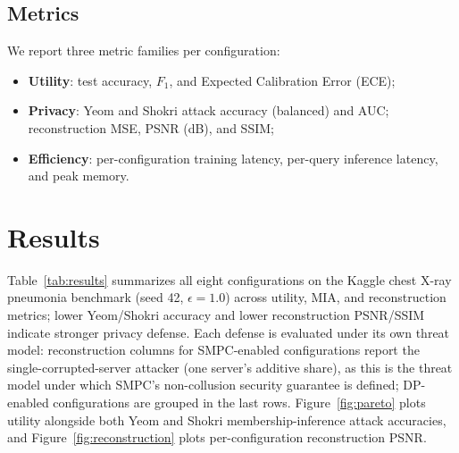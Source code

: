 \documentclass[conference]{IEEEtran}
\begin{document}
\subsection{Metrics}
We report three metric families per configuration:
\begin{itemize}
  \item \textbf{Utility}: test accuracy, $F_1$, and Expected Calibration Error (ECE);
  \item \textbf{Privacy}: Yeom and Shokri attack accuracy (balanced) and AUC; reconstruction MSE, PSNR (dB), and SSIM;
  \item \textbf{Efficiency}: per-configuration training latency, per-query inference latency, and peak memory.
\end{itemize}

\section{Results}
\label{sec:results}

Table~\ref{tab:results} summarizes all eight configurations on the Kaggle chest X-ray pneumonia benchmark (seed 42, $\epsilon=1.0$) across utility, MIA, and reconstruction metrics; lower Yeom/Shokri accuracy and lower reconstruction PSNR/SSIM indicate stronger privacy defense. Each defense is evaluated under its own threat model: reconstruction columns for SMPC-enabled configurations report the single-corrupted-server attacker (one server's additive share), as this is the threat model under which SMPC's non-collusion security guarantee is defined; DP-enabled configurations are grouped in the last rows. Figure~\ref{fig:pareto} plots utility alongside both Yeom and Shokri membership-inference attack accuracies, and Figure~\ref{fig:reconstruction} plots per-configuration reconstruction PSNR.
\end{document}
